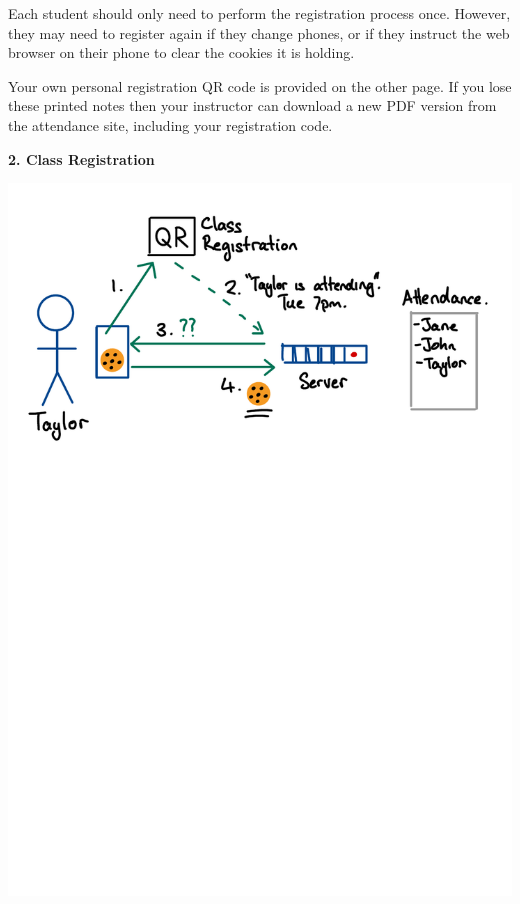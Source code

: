 \begin{minipage}[t]{\dimexpr0.5\linewidth-1em}
Each student should only need to perform the registration process once.
However, they may need to register again if they change phones,
or if they instruct the web browser on their phone to clear the cookies it is holding.

Your own personal registration QR code is provided on the other page.
If you lose these printed notes then your instructor can download a new PDF version
from the attendance site, including your registration code.
\end{minipage}
\hspace{2em}
\begin{minipage}[t]{\dimexpr0.5\linewidth-1em}
\vspace{2em}
\textbf{2. Class Registration}
\begin{center}
\includegraphics[scale=0.4]{figure/fig-class-registration.pdf}


\end{center}
\end{minipage}
